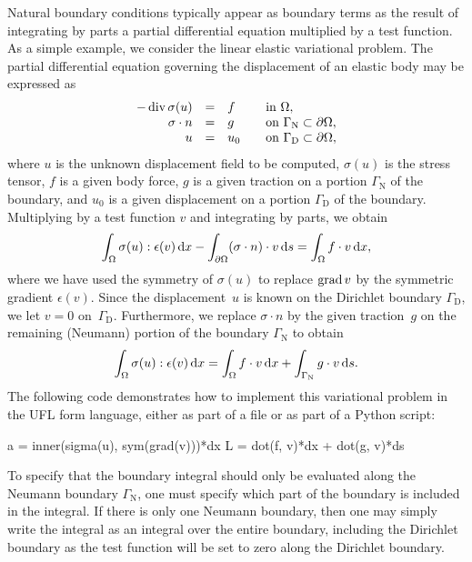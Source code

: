 Natural boundary conditions typically appear as boundary terms as the
result of integrating by parts a partial differential equation multiplied
by a test function. As a simple example, we consider the linear elastic
variational problem. The partial differential equation governing the
displacement of an elastic body may be expressed as
\begin{equation} \label{eq:logg-2:elasticity}
  \begin{array}{rcll}
    - \operatorname{div} \sigma(u) &=& f \quad &\mbox{in } \Omega,
    \\
    \sigma \cdot n &=& g \quad  &\mbox{on } \Gamma_{\mathrm{N}} \subset \partial\Omega,
    \\
    u &=& u_0 \quad  &\mbox{on } \Gamma_{\mathrm{D}} \subset \partial\Omega,
    \end{array}
\end{equation}
where $u$ is the unknown displacement field to be computed,
$\sigma(u)$ is the stress tensor, $f$ is a given body force, $g$ is a
given traction on a portion $\Gamma_{\mathrm{N}}$ of the boundary, and
$u_0$ is a given displacement on a portion $\Gamma_{\mathrm{D}}$ of
the boundary. Multiplying by a test function $v$ and integrating by
parts, we obtain
\begin{equation}
  \int_{\Omega} \sigma(u) : \epsilon(v) \, \mathrm{d}x - \int_{\partial\Omega}
  (\sigma \cdot n) \cdot v \, \mathrm{d}s = \int_{\Omega} f \cdot v \, \mathrm{d}x,
\end{equation}
where we have used the symmetry of $\sigma(u)$ to replace $\operatorname{grad} v$
by the symmetric gradient $\epsilon(v)$. Since the displacement~$u$
is known on the Dirichlet boundary $\Gamma_{\mathrm{D}}$, we let $v =
0$ on~$\Gamma_{\mathrm{D}}$. Furthermore, we replace $\sigma \cdot n$ by the
given traction~$g$ on the remaining (Neumann) portion of the boundary
$\Gamma_{\mathrm{N}}$ to obtain
\begin{equation}
  \int_{\Omega} \sigma(u) : \epsilon(v) \, \mathrm{d}x
    = \int_{\Omega} f \cdot v \, \mathrm{d}x + \int_{\Gamma_{\mathrm{N}}} g \cdot v \, \mathrm{d}s.
\end{equation}
The following code demonstrates how to implement this variational
problem in the UFL form language, either as part of a  file
or as part of a Python script:
\begin{uflcode}
a = inner(sigma(u), sym(grad(v)))*dx
L = dot(f, v)*dx + dot(g, v)*ds
\end{uflcode}

To specify that the boundary integral  should only
be evaluated along the Neumann boundary $\Gamma_{\mathrm{N}}$, one
must specify which part of the boundary is included in the 
integral. If there is only one Neumann boundary, then one may simply
write the  integral as an integral over the entire boundary,
including the Dirichlet boundary as the test function  will be
set to zero along the Dirichlet boundary.

